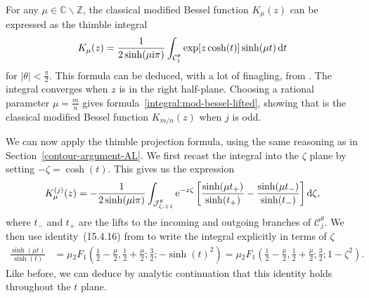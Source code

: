 \documentclass[pdftex]{sigma}
\newcommand{\Z}{\mathbb{Z}}
\newcommand{\C}{\mathbb{C}}
\numberwithin{equation}{section}
\begin{document}
For any $\mu \in \C \smallsetminus \Z$, the classical modified Bessel function $K_\mu(z)$ can be expressed as the thimble integral
\begin{equation}\label{int:mod-bessel-gen}
 K_\mu(z) = \frac{1}{2 \sinh(\mu {\rm i}\pi)} \int_{\mathcal{C}^\theta_1} \exp[z \cosh(t)] \sinh(\mu t) \,{\rm d}t
\end{equation}
for $|\theta| < \frac{\pi}{2}$. This formula can be deduced, with a lot of finagling, from \cite[formulas~(10.32.12) and~(10.27.4)]{dlmf}. The integral converges when $z$ is in the right half-plane. Choosing a rational parameter $\mu = \frac{m}{n}$ gives formula~\eqref{integral:mod-bessel-lifted}, showing that  is the classical modified Bessel function $K_{m/n}(z)$ when $j$ is odd.

We can now apply the thimble projection formula, using the same reasoning as in Section~\ref{contour-argument-AL}. We first recast the integral into the $\zeta$ plane by setting $-\zeta = \cosh(t)$. This gives us the expression
\[ K^{(j)}_\mu(z) = -\frac{1}{2\sinh(\mu {\rm i}\pi)} \int_{\mathcal{J}^\theta_{\zeta, \mp 1}} {\rm e}^{-z\zeta} \left[ \frac{\sinh(\mu t_+)}{\sinh(t_+)} - \frac{\sinh(\mu t_-)}{\sinh(t_-)} \right] {\rm d}\zeta, \]
where $t_-$ and $t_+$ are the lifts to the incoming and outgoing branches of $\mathcal{C}^\theta_j$. We then use identity~(15.4.16) from \cite{dlmf} to write the integral explicitly in terms of $\zeta$
\begin{align*}
\frac{\sinh(\mu t)}{\sinh(t)} & = \mu {}_2F_1\left(\frac{1}{2} - \frac{\mu}{2}, \frac{1}{2} + \frac{\mu}{2}; \frac{3}{2}; -\sinh(t)^2\right) = \mu {}_2F_1\left(\frac{1}{2} - \frac{\mu}{2}, \frac{1}{2} + \frac{\mu}{2}; \frac{3}{2}; 1 - \zeta^2\right).
\end{align*}
Like before, we can deduce by analytic continuation that this identity holds throughout the $t$ plane.
\end{document}
